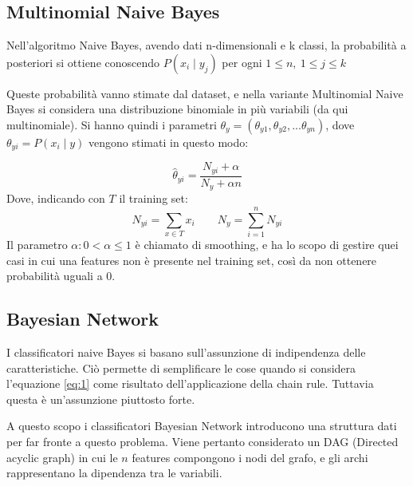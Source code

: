 \documentclass[oneside]{book}
\begin{document}
\subsection{Multinomial Naive Bayes}
Nell'algoritmo Naive Bayes, avendo dati n-dimensionali e k classi, la probabilità a posteriori si ottiene conoscendo $P(x_i \mid y_j)$ per ogni $1\leq n,\ 1\leq j \leq k$

Queste probabilità vanno stimate dal dataset, e nella variante Multinomial Naive Bayes si considera una distribuzione binomiale in più variabili (da qui multinomiale). Si hanno quindi i parametri $\theta_y = (\theta_{y1}, \theta_{y2}, ...\theta_{yn})$, dove $\theta_{yi} = P(x_i \mid y)$ vengono stimati in questo modo:

$$\hat{\theta}_{yi} = \frac{N_{yi} + \alpha }{N_{y} + \alpha n}$$
Dove, indicando con $T$ il training set:
$$N_{yi} = \sum_{x \in T}x_i \qquad
N_{y} = \sum_{i=1}^{n}N_{yi}$$
Il parametro $\alpha: 0 < \alpha \leq 1$ è chiamato di smoothing, e ha lo scopo di gestire quei casi in cui una features non è presente nel training set, così da non ottenere probabilità uguali a $0$.

\subsection{Bayesian Network}
I classificatori naive Bayes si basano sull'assunzione di indipendenza delle caratteristiche. Ciò permette di semplificare le cose quando si considera l'equazione \eqref{eq:1} come risultato dell'applicazione della chain rule.
Tuttavia questa è un'assunzione piuttosto forte.

A questo scopo i classificatori Bayesian Network introducono una struttura dati per far fronte a questo problema. Viene pertanto considerato un DAG (Directed acyclic graph) in cui le $n$ features compongono i nodi del grafo, e gli archi rappresentano la dipendenza tra le variabili.
\end{document}
